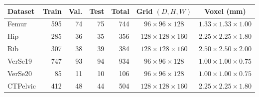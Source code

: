\begin{tabular}{lrrrrcc}
\toprule
Dataset & Train & Val. & Test & Total & Grid $(D,H,W)$ & Voxel (mm) \\
\midrule
Femur & 595 & 74 & 75 & 744 & $96\times96\times128$ & $1.33\times1.33\times1.00$ \\
Hip & 285 & 36 & 35 & 356 & $128\times128\times160$ & $2.25\times2.25\times1.80$ \\
Rib & 307 & 38 & 39 & 384 & $128\times128\times160$ & $2.50\times2.50\times2.00$ \\
VerSe19 & 747 & 93 & 94 & 934 & $96\times96\times128$ & $1.00\times1.00\times0.75$ \\
VerSe20 & 85 & 11 & 10 & 106 & $96\times96\times128$ & $1.00\times1.00\times0.75$ \\
CTPelvic & 412 & 48 & 44 & 504 & $128\times128\times160$ & $2.25\times2.25\times1.80$ \\
\bottomrule
\end{tabular}
